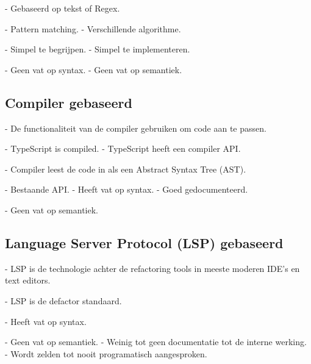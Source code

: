 - Gebaseerd op tekst of Regex.


- Pattern matching.
- Verschillende algorithme.


- Simpel te begrijpen.
- Simpel te implementeren.


- Geen vat op syntax.
- Geen vat op semantiek.

\subsection{Compiler gebaseerd}
\label{ch:stand-van-zaken:refactoring:compiler}


- De functionaliteit van de compiler gebruiken om code aan te passen.


- TypeScript is compiled.
- TypeScript heeft een compiler API.


- Compiler leest de code in als een Abstract Syntax Tree (AST).


- Bestaande API.
- Heeft vat op syntax.
- Goed gedocumenteerd.


- Geen vat op semantiek.

\subsection{Language Server Protocol (LSP) gebaseerd}
\label{ch:stand-van-zaken:refactoring:lsp}


- LSP is de technologie achter de refactoring tools in meeste moderen IDE's en text editors.


- LSP is de defactor standaard.


- Heeft vat op syntax.


- Geen vat op semantiek.
- Weinig tot geen documentatie tot de interne werking.
- Wordt zelden tot nooit programatisch aangesproken.

